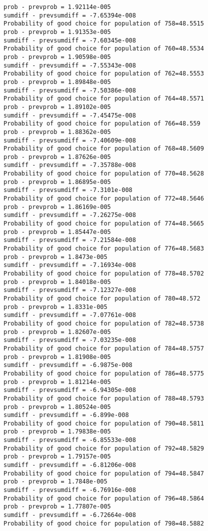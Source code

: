 \documentclass[11pt,onecolumn]{article}
\begin{document}
\begin{verbatim}
prob - prevprob = 1.92114e-005
sumdiff - prevsumdiff = -7.65394e-008
Probability of good choice for population of 758=48.5515
prob - prevprob = 1.91353e-005
sumdiff - prevsumdiff = -7.60345e-008
Probability of good choice for population of 760=48.5534
prob - prevprob = 1.90598e-005
sumdiff - prevsumdiff = -7.55343e-008
Probability of good choice for population of 762=48.5553
prob - prevprob = 1.89848e-005
sumdiff - prevsumdiff = -7.50386e-008
Probability of good choice for population of 764=48.5571
prob - prevprob = 1.89102e-005
sumdiff - prevsumdiff = -7.45475e-008
Probability of good choice for population of 766=48.559
prob - prevprob = 1.88362e-005
sumdiff - prevsumdiff = -7.40609e-008
Probability of good choice for population of 768=48.5609
prob - prevprob = 1.87626e-005
sumdiff - prevsumdiff = -7.35788e-008
Probability of good choice for population of 770=48.5628
prob - prevprob = 1.86895e-005
sumdiff - prevsumdiff = -7.3101e-008
Probability of good choice for population of 772=48.5646
prob - prevprob = 1.86169e-005
sumdiff - prevsumdiff = -7.26275e-008
Probability of good choice for population of 774=48.5665
prob - prevprob = 1.85447e-005
sumdiff - prevsumdiff = -7.21584e-008
Probability of good choice for population of 776=48.5683
prob - prevprob = 1.8473e-005
sumdiff - prevsumdiff = -7.16934e-008
Probability of good choice for population of 778=48.5702
prob - prevprob = 1.84018e-005
sumdiff - prevsumdiff = -7.12327e-008
Probability of good choice for population of 780=48.572
prob - prevprob = 1.8331e-005
sumdiff - prevsumdiff = -7.07761e-008
Probability of good choice for population of 782=48.5738
prob - prevprob = 1.82607e-005
sumdiff - prevsumdiff = -7.03235e-008
Probability of good choice for population of 784=48.5757
prob - prevprob = 1.81908e-005
sumdiff - prevsumdiff = -6.9875e-008
Probability of good choice for population of 786=48.5775
prob - prevprob = 1.81214e-005
sumdiff - prevsumdiff = -6.94305e-008
Probability of good choice for population of 788=48.5793
prob - prevprob = 1.80524e-005
sumdiff - prevsumdiff = -6.899e-008
Probability of good choice for population of 790=48.5811
prob - prevprob = 1.79838e-005
sumdiff - prevsumdiff = -6.85533e-008
Probability of good choice for population of 792=48.5829
prob - prevprob = 1.79157e-005
sumdiff - prevsumdiff = -6.81206e-008
Probability of good choice for population of 794=48.5847
prob - prevprob = 1.7848e-005
sumdiff - prevsumdiff = -6.76916e-008
Probability of good choice for population of 796=48.5864
prob - prevprob = 1.77807e-005
sumdiff - prevsumdiff = -6.72664e-008
Probability of good choice for population of 798=48.5882

\end{verbatim}
\end{document}
